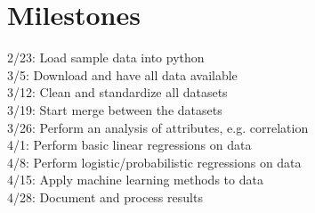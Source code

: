 \documentclass[sigconf, 11pt]{acmart}
\begin{document}
\section{Milestones}
2/23: Load sample data into python \\
3/5: Download and have all data available \\
3/12: Clean and standardize all datasets \\
3/19: Start merge between the datasets \\
3/26: Perform an analysis of attributes, e.g. correlation \\
4/1: Perform basic linear regressions on data \\
4/8: Perform logistic/probabilistic regressions on data \\
4/15: Apply machine learning methods to data \\
4/28: Document and process results \\


\end{document}
